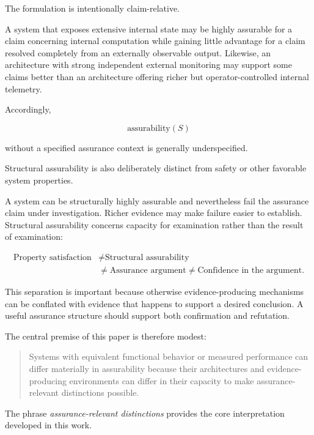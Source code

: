 The formulation is intentionally claim-relative.

A system that exposes extensive internal state may be highly assurable for a claim concerning internal computation while
gaining little advantage for a claim resolved completely from an externally observable output.
Likewise, an architecture with strong independent external monitoring may support some claims better
than an architecture offering richer but operator-controlled internal telemetry.

Accordingly,

\begin{equation}
  \text{assurability}(S)
\end{equation}

without a specified assurance context is generally underspecified.

Structural assurability is also deliberately distinct from safety or other favorable system properties.

A system can be structurally highly assurable and nevertheless fail the assurance claim under investigation.
Richer evidence may make failure easier to establish.
Structural assurability concerns capacity for examination rather than the result of examination:

\begin{equation}
  \boxed{
    \begin{aligned}
      \text{Property satisfaction}
       & \neq
      \text{Structural assurability} \\
       & \neq
      \text{Assurance argument}
      \neq
      \text{Confidence in the argument}.
    \end{aligned}
  }
\end{equation}

This separation is important because otherwise evidence-producing mechanisms can be conflated with
evidence that happens to support a desired conclusion.
A useful assurance structure should support both confirmation and refutation.

The central premise of this paper is therefore modest:

\begin{quote}
  Systems with equivalent functional behavior or measured performance can differ materially in assurability because their
  architectures and evidence-producing environments can differ in their capacity to make assurance-relevant distinctions possible.
\end{quote}

The phrase \emph{assurance-relevant distinctions} provides the core interpretation developed in this work.

